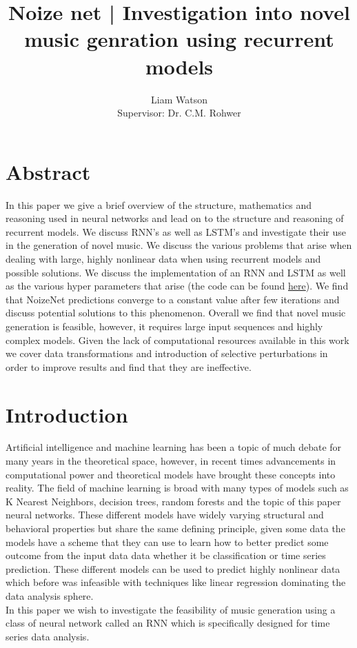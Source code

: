 \documentclass{article}
\title{Noize net | Investigation into novel music genration using recurrent models}
\author{Liam Watson \\
Supervisor: Dr. C.M. Rohwer}
\begin{document}
\maketitle
\tableofcontents
\section{Abstract}
In this paper we give a brief overview of the structure, mathematics and reasoning used in neural networks and lead on to the structure and reasoning of recurrent models. We discuss RNN's as well as LSTM's and investigate their use in the generation of novel music. We discuss the various problems that arise when dealing with large, highly nonlinear data when using recurrent models and possible solutions. We discuss the implementation of an RNN and LSTM as well as the various hyper parameters that arise (the code can be found \href{https://github.com/Liam-Watson/NoizeNet/blob/main/code/FinalNoteBook.ipynb}{here}). We find that NoizeNet predictions converge to a constant value after few iterations and discuss potential solutions to this phenomenon. Overall we find that novel music generation is feasible, however, it requires large input sequences and highly complex models. Given the lack of computational resources available in this work we cover data transformations and introduction of selective perturbations in order to improve results and find that they are ineffective.
\section{Introduction}
Artificial intelligence and machine learning has been a topic of much debate for many years in the theoretical space, however, in recent times advancements in computational power and theoretical models have brought these concepts into reality. The field of machine learning is broad with many types of models such as K Nearest Neighbors, decision trees, random forests and the topic of this paper neural networks. These different models have widely varying structural and behavioral properties but share the same defining principle, given some data the models have a scheme that they can use to learn how to better predict some outcome from the input data data whether it be classification or time series prediction. These different models can be used to predict highly nonlinear data which before was infeasible with techniques like linear regression dominating the data analysis sphere. \\
In this paper we wish to investigate the feasibility of music generation using a class of neural network called an RNN which is specifically designed for time series data analysis.  
\end{document}
